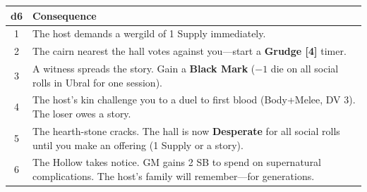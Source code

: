 \begin{center}
\begin{tabular}{|c|l|}
\hline
\textbf{d6} & \textbf{Consequence} \\
\hline
1 & The host demands a wergild of 1 Supply immediately. \\
2 & The cairn nearest the hall votes against you---start a \textbf{Grudge [4]} timer. \\
3 & A witness spreads the story. Gain a \textbf{Black Mark} (\(-1\) die on all social rolls in Ubral for one session). \\
4 & The host's kin challenge you to a duel to first blood (Body+Melee, DV 3). The loser owes a story. \\
5 & The hearth-stone cracks. The hall is now \textbf{Desperate} for all social rolls until you make an offering (1 Supply or a story). \\
6 & The Hollow takes notice. GM gains 2 SB to spend on supernatural complications. The host's family will remember---for generations. \\
\hline
\end{tabular}
\end{center}

